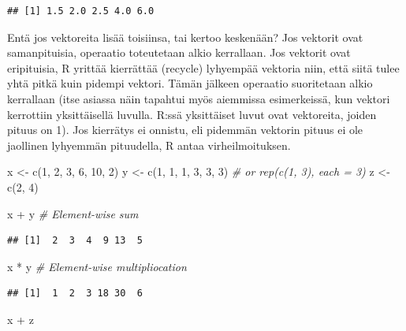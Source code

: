 \documentclass[
]{book}
\newenvironment{Shaded}{\begin{snugshade}}{\end{snugshade}}
\newcommand{\CommentTok}[1]{\textcolor[rgb]{0.56,0.35,0.01}{\textit{#1}}}
\newcommand{\DecValTok}[1]{\textcolor[rgb]{0.00,0.00,0.81}{#1}}
\newcommand{\FunctionTok}[1]{\textcolor[rgb]{0.00,0.00,0.00}{#1}}
\newcommand{\NormalTok}[1]{#1}
\newcommand{\OtherTok}[1]{\textcolor[rgb]{0.56,0.35,0.01}{#1}}
\newcommand{\SpecialCharTok}[1]{\textcolor[rgb]{0.00,0.00,0.00}{#1}}
\begin{document}
\begin{verbatim}
## [1] 1.5 2.0 2.5 4.0 6.0
\end{verbatim}

Entä jos vektoreita lisää toisiinsa, tai kertoo keskenään? Jos vektorit ovat samanpituisia, operaatio toteutetaan alkio kerrallaan. Jos vektorit ovat eripituisia, R yrittää kierrättää (recycle) lyhyempää vektoria niin, että siitä tulee yhtä pitkä kuin pidempi vektori. Tämän jälkeen operaatio suoritetaan alkio kerrallaan (itse asiassa näin tapahtui myös aiemmissa esimerkeissä, kun vektori kerrottiin yksittäisellä luvulla. R:ssä yksittäiset luvut ovat vektoreita, joiden pituus on 1). Jos kierrätys ei onnistu, eli pidemmän vektorin pituus ei ole jaollinen lyhyemmän pituudella, R antaa virheilmoituksen.

\begin{Shaded}
\begin{Highlighting}[]
\NormalTok{x }\OtherTok{\textless{}{-}} \FunctionTok{c}\NormalTok{(}\DecValTok{1}\NormalTok{, }\DecValTok{2}\NormalTok{, }\DecValTok{3}\NormalTok{, }\DecValTok{6}\NormalTok{, }\DecValTok{10}\NormalTok{, }\DecValTok{2}\NormalTok{)}
\NormalTok{y }\OtherTok{\textless{}{-}} \FunctionTok{c}\NormalTok{(}\DecValTok{1}\NormalTok{, }\DecValTok{1}\NormalTok{, }\DecValTok{1}\NormalTok{, }\DecValTok{3}\NormalTok{, }\DecValTok{3}\NormalTok{, }\DecValTok{3}\NormalTok{) }\CommentTok{\# or rep(c(1, 3), each = 3)}
\NormalTok{z }\OtherTok{\textless{}{-}} \FunctionTok{c}\NormalTok{(}\DecValTok{2}\NormalTok{, }\DecValTok{4}\NormalTok{)}

\NormalTok{x }\SpecialCharTok{+}\NormalTok{ y }\CommentTok{\# Element{-}wise sum}
\end{Highlighting}
\end{Shaded}

\begin{verbatim}
## [1]  2  3  4  9 13  5
\end{verbatim}

\begin{Shaded}
\begin{Highlighting}[]
\NormalTok{x }\SpecialCharTok{*}\NormalTok{ y }\CommentTok{\# Element{-}wise multipliocation}
\end{Highlighting}
\end{Shaded}

\begin{verbatim}
## [1]  1  2  3 18 30  6
\end{verbatim}

\begin{Shaded}
\begin{Highlighting}[]
\NormalTok{x }\SpecialCharTok{+}\NormalTok{ z}
\end{Highlighting}
\end{Shaded}
\end{document}
